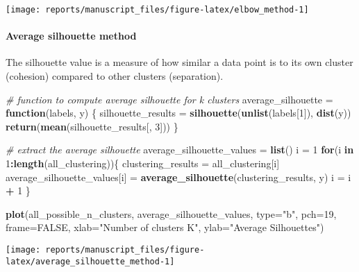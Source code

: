 \documentclass[9pt,a4paper,]{extarticle}
\newenvironment{Shaded}{\begin{snugshade}}{\end{snugshade}}
\newcommand{\CommentTok}[1]{\textcolor[rgb]{0.56,0.35,0.01}{\textit{#1}}}
\newcommand{\ControlFlowTok}[1]{\textcolor[rgb]{0.13,0.29,0.53}{\textbf{#1}}}
\newcommand{\DataTypeTok}[1]{\textcolor[rgb]{0.13,0.29,0.53}{#1}}
\newcommand{\DecValTok}[1]{\textcolor[rgb]{0.00,0.00,0.81}{#1}}
\newcommand{\KeywordTok}[1]{\textcolor[rgb]{0.13,0.29,0.53}{\textbf{#1}}}
\newcommand{\NormalTok}[1]{#1}
\newcommand{\OperatorTok}[1]{\textcolor[rgb]{0.81,0.36,0.00}{\textbf{#1}}}
\newcommand{\OtherTok}[1]{\textcolor[rgb]{0.56,0.35,0.01}{#1}}
\newcommand{\StringTok}[1]{\textcolor[rgb]{0.31,0.60,0.02}{#1}}
\begin{document}
\begin{center}\texttt{[image: reports/manuscript\_files/figure-latex/elbow\_method-1]} \end{center}

\hypertarget{average-silhouette-method}{%
\paragraph{Average silhouette method}\label{average-silhouette-method}}

The silhouette value is a measure of how similar a data point is to its own
cluster (cohesion) compared to other clusters (separation).

\begin{Shaded}
\begin{Highlighting}[]
\CommentTok{# function to compute average silhouette for k clusters}
\NormalTok{average_silhouette =}\StringTok{ }\ControlFlowTok{function}\NormalTok{(labels, y) \{}
\NormalTok{    silhouette_results =}\StringTok{ }\KeywordTok{silhouette}\NormalTok{(}\KeywordTok{unlist}\NormalTok{(labels[}\DecValTok{1}\NormalTok{]), }\KeywordTok{dist}\NormalTok{(y))}
    \KeywordTok{return}\NormalTok{(}\KeywordTok{mean}\NormalTok{(silhouette_results[, }\DecValTok{3}\NormalTok{]))}
\NormalTok{\}}

\CommentTok{# extract the average silhouette}
\NormalTok{average_silhouette_values =}\StringTok{ }\KeywordTok{list}\NormalTok{()}
\NormalTok{i =}\StringTok{ }\DecValTok{1}
\ControlFlowTok{for}\NormalTok{(i }\ControlFlowTok{in} \DecValTok{1}\OperatorTok{:}\KeywordTok{length}\NormalTok{(all_clustering))\{}
\NormalTok{    clustering_results =}\StringTok{ }\NormalTok{all_clustering[i]}
\NormalTok{    average_silhouette_values[i] =}\StringTok{ }\KeywordTok{average_silhouette}\NormalTok{(clustering_results, y)}
\NormalTok{    i =}\StringTok{ }\NormalTok{i }\OperatorTok{+}\StringTok{ }\DecValTok{1}
\NormalTok{\}}

\KeywordTok{plot}\NormalTok{(all_possible_n_clusters, average_silhouette_values,}
     \DataTypeTok{type=}\StringTok{"b"}\NormalTok{, }\DataTypeTok{pch=}\DecValTok{19}\NormalTok{, }\DataTypeTok{frame=}\OtherTok{FALSE}\NormalTok{,}
     \DataTypeTok{xlab=}\StringTok{"Number of clusters K"}\NormalTok{,}
     \DataTypeTok{ylab=}\StringTok{"Average Silhouettes"}\NormalTok{)}
\end{Highlighting}
\end{Shaded}

\begin{center}\texttt{[image: reports/manuscript\_files/figure-latex/average\_silhouette\_method-1]} \end{center}
\end{document}
